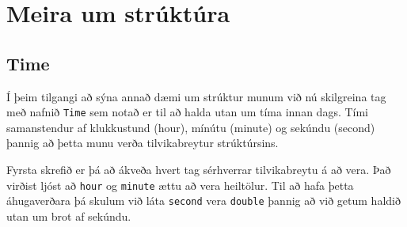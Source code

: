 





\chapter{Meira um strúktúra}
\label{time}

\section{Time}

Í þeim tilgangi að sýna annað dæmi um strúktur munum við nú skilgreina tag með nafnið {\tt Time} sem notað er til að halda utan um tíma innan dags.
Tími samanstendur af klukkustund (hour), mínútu (minute) og sekúndu (second) þannig að þetta munu verða tilvikabreytur strúktúrsins.

Fyrsta skrefið er þá að ákveða hvert tag sérhverrar tilvikabreytu á að vera.
Það virðist ljóst að {\tt hour} og {\tt minute} ættu að vera heiltölur.
Til að hafa þetta áhugaverðara þá skulum við láta {\tt second} vera {\tt double} þannig að við getum haldið utan um brot af sekúndu.

